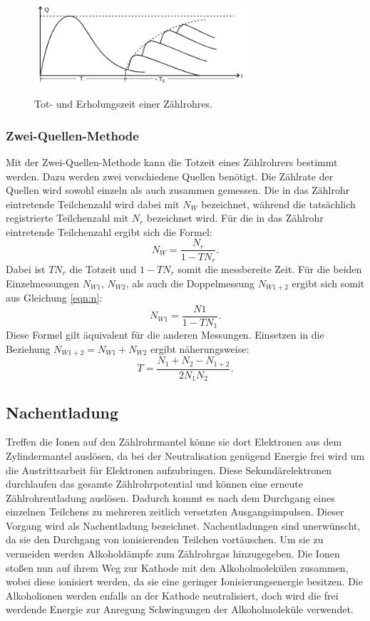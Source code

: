 \begin{figure}
  \centering
  \includegraphics[width=8cm]{tot.png}
  \caption{Tot- und Erholungszeit einer Zählrohres.}
  \cite{skript}
\end{figure}

\subsubsection{Zwei-Quellen-Methode}
Mit der Zwei-Quellen-Methode kann die Totzeit eines Zählrohrers bestimmt werden.
Dazu werden zwei verschiedene Quellen benötigt. Die Zählrate der Quellen wird sowohl einzeln
als auch zusammen gemessen. Die in das Zählrohr eintretende Teilchenzahl wird dabei mit $N_W$
bezeichnet, während die tatsächlich registrierte Teilchenzahl mit $N_r$
bezeichnet wird. Für die in das Zählrohr eintretende Teilchenzahl ergibt sich die
Formel:
\begin{equation}
  N_W=\frac{N_r}{1-TN_r}.
  \label{eqn:n}
\end{equation}
Dabei ist $TN_r$ die Totzeit und $1-TN_r$ somit die messbereite Zeit.
Für die beiden Einzelmessungen $N_{W1}$, $N_{W2}$, als auch die Doppelmessung $N_{W1+2}$ ergibt sich somit aus
Gleichung \ref{eqn:n}:
\begin{equation}
  N_{W1}=\frac{N1}{1-TN_1}.
\end{equation}
Diese Formel gilt äquivalent für die anderen Messungen.
Einsetzen in die Beziehung $N_{W1+2}=N_{W1}+N_{W2}$ ergibt näherungsweise:
\begin{equation}
  T=\frac{N_1+ N_2- N_{1+2}}{2N_1 N_2}.
\end{equation}

\subsection{Nachentladung}
Treffen die Ionen auf den Zählrohrmantel könne sie dort Elektronen aus dem
Zylindermantel auslösen, da bei der Neutralisation genügend Energie frei wird
um die Austrittsarbeit für Elektronen aufzubringen. Diese Sekundärelektronen
durchlaufen das gesamte Zählrohrpotential und können eine erneute Zählrohrentladung
auslösen. Dadurch kommt es nach dem Durchgang eines einzelnen Teilchens zu mehreren zeitlich
versetzten Ausgangsimpulsen. Dieser Vorgang wird als Nachentladung bezeichnet.
Nachentladungen sind unerwünscht, da sie den Durchgang von ionisierenden Teilchen
vortäuschen. Um sie zu vermeiden werden Alkoholdämpfe zum Zählrohrgas hinzugegeben.
Die Ionen stoßen nun auf ihrem Weg zur Kathode mit den Alkoholmolekülen zusammen, wobei
diese ionisiert werden, da sie eine geringer Ionisierungsenergie besitzen.
Die Alkoholionen werden enfalls an der Kathode neutralisiert, doch wird die frei werdende
Energie zur Anregung Schwingungen der Alkoholmoleküle verwendet.

